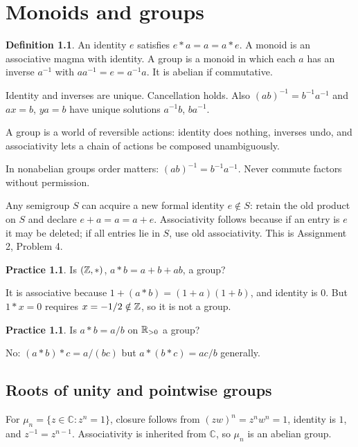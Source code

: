 \documentclass[11pt,openany]{book}
\newcommand{\C}{\mathbb C}\newcommand{\PP}{\mathcal P}
\theoremstyle{definition}
\newtheorem{definition}[theorem]{Definition}
\newtheorem{exercise}[theorem]{Practice}
\begin{document}
\chapter{Monoids and groups}
\begin{definition}An identity $e$ satisfies $e*a=a=a*e$. A monoid is an associative magma with identity. A group is a monoid in which each $a$ has an inverse $a^{-1}$ with $aa^{-1}=e=a^{-1}a$. It is abelian if commutative.\end{definition}
Identity and inverses are unique. Cancellation holds. Also $(ab)^{-1}=b^{-1}a^{-1}$ and $ax=b$, $ya=b$ have unique solutions $a^{-1}b$, $ba^{-1}$.
\begin{intuition}A group is a world of reversible actions: identity does nothing, inverses undo, and associativity lets a chain of actions be composed unambiguously.\end{intuition}
\begin{warningbox}In nonabelian groups order matters: $(ab)^{-1}=b^{-1}a^{-1}$. Never commute factors without permission.\end{warningbox}

Any semigroup $S$ can acquire a new formal identity $e\notin S$: retain the old product on $S$ and declare $e+a=a=a+e$. Associativity follows because if an entry is $e$ it may be deleted; if all entries lie in $S$, use old associativity. This is Assignment 2, Problem 4.

\begin{exercise}Is $(\mathbb Z,*)$, $a*b=a+b+ab$, a group?\end{exercise}
\begin{solution}It is associative because $1+(a*b)=(1+a)(1+b)$, and identity is $0$. But $1*x=0$ requires $x=-1/2\notin\mathbb Z$, so it is not a group.\end{solution}
\begin{exercise}Is $a*b=a/b$ on $\mathbb R_{>0}$ a group?\end{exercise}
\begin{solution}No: $(a*b)*c=a/(bc)$ but $a*(b*c)=ac/b$ generally.\end{solution}

\section{Roots of unity and pointwise groups}
For $\mu_n=\{z\in\C:z^n=1\}$, closure follows from $(zw)^n=z^nw^n=1$, identity is $1$, and $z^{-1}=z^{n-1}$. Associativity is inherited from $\C$, so $\mu_n$ is an abelian group.
\end{document}
